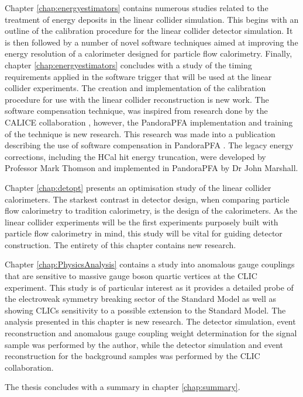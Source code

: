 Chapter \ref{chap:energyestimators} contains numerous studies related to the treatment of energy deposits in the linear collider simulation.  This begins with an outline of the calibration procedure for the linear collider detector simulation.  It is then followed by a number of novel software techniques aimed at improving the energy resolution of a calorimeter designed for particle flow calorimetry.  Finally, chapter \ref{chap:energyestimators} concludes with a study of the timing requirements applied in the software trigger that will be used at the linear collider experiments.  {The creation and implementation of the calibration procedure for use with the linear collider reconstruction is new work.  The software compensation technique, was inspired from research done by the CALICE collaboration \cite{Adloff:2012gv}, however, the PandoraPFA implementation and training of the technique is new research.  This research was made into a publication describing the use of software compensation in PandoraPFA \cite{Tran:2017tgr}.  The legacy energy corrections, including the HCal hit energy truncation, were developed by Professor Mark Thomson and implemented in PandoraPFA by Dr John Marshall.}  

Chapter \ref{chap:detopt} presents an optimisation study of the linear collider calorimeters.  The starkest contrast in detector design, when comparing particle flow calorimetry to tradition calorimetry, is the design of the calorimeters.  As the linear collider experiments will be the first experiments {purposely} built with particle flow calorimetry in mind, this study will be vital for guiding detector construction.  {The entirety of this chapter contains new research.}

Chapter \ref{chap:PhysicsAnalysis} contains a study into anomalous gauge couplings that are sensitive to massive gauge boson quartic vertices at the CLIC experiment.  This study is of particular interest as it provides a detailed probe of the electroweak symmetry breaking sector of the Standard Model as well as showing CLICs sensitivity to a possible extension to the Standard Model.  {The analysis presented in this chapter is new research.  The detector simulation, event reconstruction and anomalous gauge coupling weight determination for the signal sample was performed by the author, while the detector simulation and event reconstruction for the background samples was performed by the CLIC collaboration.}
  
The thesis concludes with a summary in chapter \ref{chap:summary}.

